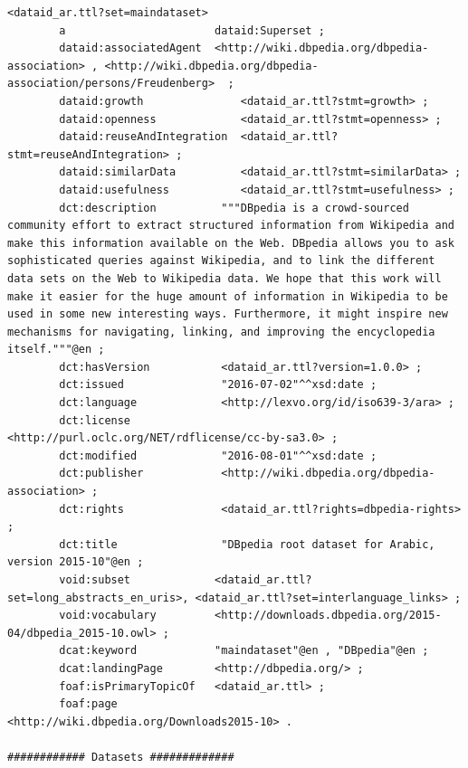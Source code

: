 \documentclass[a4paper,english,twoside,BCOR1.5cm,headsepline,DIV12,appendixprefix,final,12pt]{scrbook}
\begin{document}
\begin{lstlisting}[language=ttl, captionpos=b, label=lst:dcex,linewidth=\columnwidth,breaklines=true,basicstyle=\ttfamily\scriptsize]
<dataid_ar.ttl?set=maindataset>
        a                       dataid:Superset ;
        dataid:associatedAgent  <http://wiki.dbpedia.org/dbpedia-association> , <http://wiki.dbpedia.org/dbpedia-association/persons/Freudenberg>  ;
        dataid:growth               <dataid_ar.ttl?stmt=growth> ;
        dataid:openness             <dataid_ar.ttl?stmt=openness> ;
        dataid:reuseAndIntegration  <dataid_ar.ttl?stmt=reuseAndIntegration> ;
        dataid:similarData          <dataid_ar.ttl?stmt=similarData> ;
        dataid:usefulness           <dataid_ar.ttl?stmt=usefulness> ;
        dct:description          """DBpedia is a crowd-sourced community effort to extract structured information from Wikipedia and make this information available on the Web. DBpedia allows you to ask sophisticated queries against Wikipedia, and to link the different data sets on the Web to Wikipedia data. We hope that this work will make it easier for the huge amount of information in Wikipedia to be used in some new interesting ways. Furthermore, it might inspire new mechanisms for navigating, linking, and improving the encyclopedia itself."""@en ;
        dct:hasVersion           <dataid_ar.ttl?version=1.0.0> ;
        dct:issued               "2016-07-02"^^xsd:date ;
        dct:language             <http://lexvo.org/id/iso639-3/ara> ;
        dct:license              <http://purl.oclc.org/NET/rdflicense/cc-by-sa3.0> ;
        dct:modified             "2016-08-01"^^xsd:date ;
        dct:publisher            <http://wiki.dbpedia.org/dbpedia-association> ;
        dct:rights               <dataid_ar.ttl?rights=dbpedia-rights> ;
        dct:title                "DBpedia root dataset for Arabic, version 2015-10"@en ;
        void:subset             <dataid_ar.ttl?set=long_abstracts_en_uris>, <dataid_ar.ttl?set=interlanguage_links> ;
        void:vocabulary         <http://downloads.dbpedia.org/2015-04/dbpedia_2015-10.owl> ;
        dcat:keyword            "maindataset"@en , "DBpedia"@en ;
        dcat:landingPage        <http://dbpedia.org/> ;
        foaf:isPrimaryTopicOf   <dataid_ar.ttl> ;
        foaf:page               <http://wiki.dbpedia.org/Downloads2015-10> .

############ Datasets #############
     

\end{lstlisting}
\end{document}
